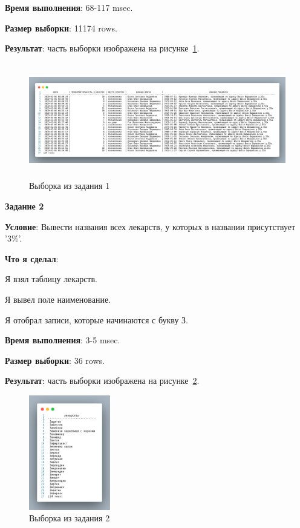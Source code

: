 \textbf{Время выполнения}: 68-117 msec.

\textbf{Размер выборки}: 11174 rows.

\textbf{Результат}: часть выборки изображена на рисунке~\ref{fig:t1}.

\begin{figure}[!h]
  \centering

  \includegraphics[height=5cm]
  {../sql/task1/1-out.png}

  \caption{Выборка из задания 1}

  \label{fig:t1}
\end{figure}


\begin{center}
  \textbf{Задание 2}
\end{center}
  
\textbf{Условие}:
Вывести названия всех лекарств, у которых в названии присутствует '3\%'.
  
\textbf{Что я сделал}:

Я взял таблицу лекарств.

Я вывел поле наименование.

Я отобрал записи, которые начинаются с букву З.



\textbf{Время выполнения}: 3-5 msec.

\textbf{Размер выборки}: 36 rows.

\textbf{Результат}: часть выборки изображена на рисунке~\ref{fig:t2}.

\begin{figure}[!h]
  \centering

  \includegraphics[height=5cm]
  {../sql/select/2-out.png}

  \caption{Выборка из задания 2}

  \label{fig:t2}
\end{figure}

